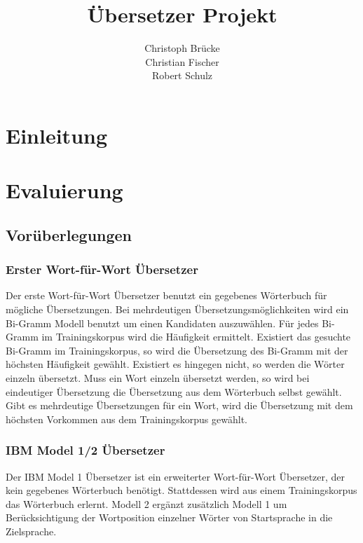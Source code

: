 \documentclass[12pt]{amsart}
\title{Übersetzer Projekt}
\author{Christoph Brücke \\
	Christian Fischer\\
	Robert Schulz}
\date{} %
\begin{document}
\maketitle
\tableofcontents

\section{Einleitung}

\section{Evaluierung}
\subsection{Vorüberlegungen}
\subsubsection{Erster Wort-für-Wort Übersetzer}
Der erste Wort-für-Wort Übersetzer benutzt ein gegebenes Wörterbuch für mögliche Übersetzungen. Bei mehrdeutigen Übersetzungsmöglichkeiten wird ein Bi-Gramm Modell benutzt um einen Kandidaten auszuwählen. Für jedes Bi-Gramm im Trainingskorpus wird die Häufigkeit ermittelt. Existiert das gesuchte Bi-Gramm im Trainingskorpus, so wird die Übersetzung des  Bi-Gramm mit der höchsten Häufigkeit gewählt. Existiert es hingegen nicht, so werden die Wörter einzeln übersetzt. Muss ein Wort einzeln übersetzt werden, so wird bei eindeutiger Übersetzung die Übersetzung aus dem Wörterbuch selbst gewählt. Gibt es mehrdeutige Übersetzungen für ein Wort, wird die Übersetzung mit dem höchsten Vorkommen aus dem Trainingskorpus gewählt.

\subsubsection{IBM Model 1/2 Übersetzer}
Der IBM Model 1 Übersetzer ist ein erweiterter Wort-für-Wort Übersetzer, der kein gegebenes Wörterbuch benötigt. Stattdessen wird aus einem Trainingskorpus das Wörterbuch erlernt. Modell 2 ergänzt zusätzlich Modell 1 um Berücksichtigung der Wortposition einzelner Wörter von Startsprache in die Zielsprache.
\end{document}
